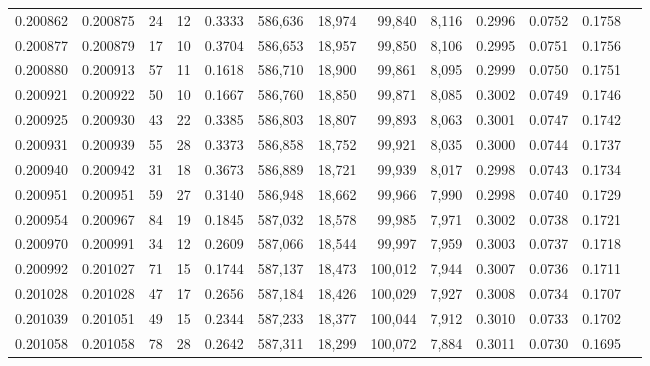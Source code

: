 \begin{tabular}{rrrrrrrrrrrrr}
0.200862 & 0.200875 &    24 &  12 &                                     0.3333 & 586,636 &  18,974 &  99,840 &   8,116 & 0.2996 & 0.0752 & 0.1758 \\
0.200877 & 0.200879 &    17 &  10 &                                     0.3704 & 586,653 &  18,957 &  99,850 &   8,106 & 0.2995 & 0.0751 & 0.1756 \\
0.200880 & 0.200913 &    57 &  11 &                                     0.1618 & 586,710 &  18,900 &  99,861 &   8,095 & 0.2999 & 0.0750 & 0.1751 \\
0.200921 & 0.200922 &    50 &  10 &                                     0.1667 & 586,760 &  18,850 &  99,871 &   8,085 & 0.3002 & 0.0749 & 0.1746 \\
0.200925 & 0.200930 &    43 &  22 &                                     0.3385 & 586,803 &  18,807 &  99,893 &   8,063 & 0.3001 & 0.0747 & 0.1742 \\
0.200931 & 0.200939 &    55 &  28 &                                     0.3373 & 586,858 &  18,752 &  99,921 &   8,035 & 0.3000 & 0.0744 & 0.1737 \\
0.200940 & 0.200942 &    31 &  18 &                                     0.3673 & 586,889 &  18,721 &  99,939 &   8,017 & 0.2998 & 0.0743 & 0.1734 \\
0.200951 & 0.200951 &    59 &  27 &                                     0.3140 & 586,948 &  18,662 &  99,966 &   7,990 & 0.2998 & 0.0740 & 0.1729 \\
0.200954 & 0.200967 &    84 &  19 &                                     0.1845 & 587,032 &  18,578 &  99,985 &   7,971 & 0.3002 & 0.0738 & 0.1721 \\
0.200970 & 0.200991 &    34 &  12 &                                     0.2609 & 587,066 &  18,544 &  99,997 &   7,959 & 0.3003 & 0.0737 & 0.1718 \\
0.200992 & 0.201027 &    71 &  15 &                                     0.1744 & 587,137 &  18,473 & 100,012 &   7,944 & 0.3007 & 0.0736 & 0.1711 \\
0.201028 & 0.201028 &    47 &  17 &                                     0.2656 & 587,184 &  18,426 & 100,029 &   7,927 & 0.3008 & 0.0734 & 0.1707 \\
0.201039 & 0.201051 &    49 &  15 &                                     0.2344 & 587,233 &  18,377 & 100,044 &   7,912 & 0.3010 & 0.0733 & 0.1702 \\
0.201058 & 0.201058 &    78 &  28 &                                     0.2642 & 587,311 &  18,299 & 100,072 &   7,884 & 0.3011 & 0.0730 & 0.1695 \\

\end{tabular}
